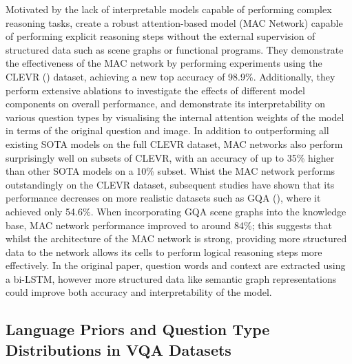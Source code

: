 Motivated by the lack of interpretable models capable of performing complex reasoning tasks, \citeauthor{hudson2018compositional} create a robust attention-based model (MAC Network) capable of performing explicit reasoning steps without the external supervision of structured data such as scene graphs or functional programs. They demonstrate the effectiveness of the MAC network by performing experiments using the CLEVR (\cite{johnson2017clevr}) dataset, achieving a new top accuracy of 98.9\%. Additionally, they perform extensive ablations to investigate the effects of different model components on overall performance, and demonstrate its interpretability on various question types by visualising the internal attention weights of the model in terms of the original question and image. In addition to outperforming all existing SOTA models on the full CLEVR dataset, MAC networks also perform surprisingly well on subsets of CLEVR, with an accuracy of up to 35\% higher than other SOTA models on a 10\% subset. Whist the MAC network performs outstandingly on the CLEVR dataset, subsequent studies have shown that its performance decreases on more realistic datasets such as GQA (\cite{hudson2019gqa}), where it achieved only 54.6\%. When incorporating GQA scene graphs into the knowledge base, MAC network performance improved to around 84\%; this suggests that whilst the architecture of the MAC network is strong, providing more structured data to the network allows its cells to perform logical reasoning steps more effectively. In the original paper, question words and context are extracted using a bi-LSTM, however more structured data like semantic graph representations could improve both accuracy and interpretability of the model.





\subsection*{Language Priors and Question Type Distributions in VQA Datasets}

